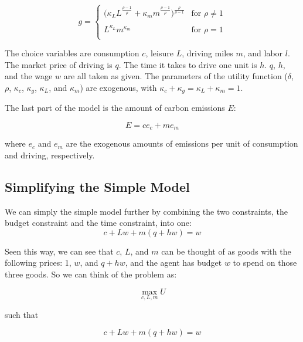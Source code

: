 \documentclass[letter, 12pt, epsf,leqno]{article}
\begin{document}
\begin{equation}g=
   \begin{cases} 
       \Bigg(\kappa_L L^\frac{\rho-1}{\rho} + \kappa_m m^\frac{\rho-1}{\rho} \Bigg)^\frac{\rho}{\rho-1}& \text{for } \rho \ne 1 \\
      \\
     L^{\kappa_L}m^{\kappa_m} & \text{for } \rho = 1\\ 
   \end{cases}
\end{equation}

The choice variables are consumption $c$, leisure $L$, driving miles $m$, and labor $l$.  The market price of driving is $q$.  The time it takes to drive one unit is $h$.  $q$, $h$, and the wage $w$ are all taken as given.  The parameters of the utility function ($\delta$, $\rho$, $\kappa_c$, $\kappa_g$, $\kappa_L$, and $\kappa_m$) are exogenous, with $\kappa_c+\kappa_g = \kappa_L+\kappa_m=1$.

The last part of the model is the amount of carbon emissions $E$:

\begin{equation}E = ce_c + me_m\label{eq:emissions}\end{equation}

where $e_c$ and $e_m$ are the exogenous amounts of emissions per unit of consumption and driving, respectively.

\subsection{Simplifying the Simple Model}

We can simply the simple model further by combining the two constraints, the budget constraint and the time constraint, into one:
\begin{equation}c+Lw +m(q+hw) =w\label{eq:budget}\end{equation}

Seen this way, we can see that $c$, $L$, and $m$ can be thought of as goods with the following prices: 1, $w$, and $q+hw$, and the agent has budget $w$ to spend on those three goods.  So we can think of the problem as:

\begin{equation}\max_{c, L, m} U\label{eq:optim}\end{equation}

such that

\begin{equation}c+Lw +m(q+hw) =w\end{equation}
\end{document}

